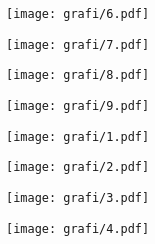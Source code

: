 \documentclass{article}
\begin{document}
\begin{figure}[H]
\centering
\begin{subfigure}{.7\textwidth}
\texttt{[image: grafi/6.pdf]}
\end{subfigure}
\end{figure}

\begin{figure}[H]
\centering
\begin{subfigure}{.7\textwidth}
\texttt{[image: grafi/7.pdf]}
\end{subfigure}
\end{figure}

\begin{figure}[H]
\centering
\begin{subfigure}{.7\textwidth}
\texttt{[image: grafi/8.pdf]}
\end{subfigure}
\end{figure}

\begin{figure}[H]
\centering
\begin{subfigure}{.7\textwidth}
\texttt{[image: grafi/9.pdf]}
\end{subfigure}
\end{figure}

\begin{figure}[H]
\centering
\begin{subfigure}{.7\textwidth}
\texttt{[image: grafi/1.pdf]}
\end{subfigure}
\end{figure}

\begin{figure}[H]
\centering
\begin{subfigure}{.7\textwidth}
\texttt{[image: grafi/2.pdf]}
\end{subfigure}
\end{figure}

\begin{figure}[H]
\centering
\begin{subfigure}{.7\textwidth}
\texttt{[image: grafi/3.pdf]}
\end{subfigure}
\end{figure}

\begin{figure}[H]
\centering
\begin{subfigure}{.7\textwidth}
\texttt{[image: grafi/4.pdf]}
\end{subfigure}
\end{figure}
\end{document}
